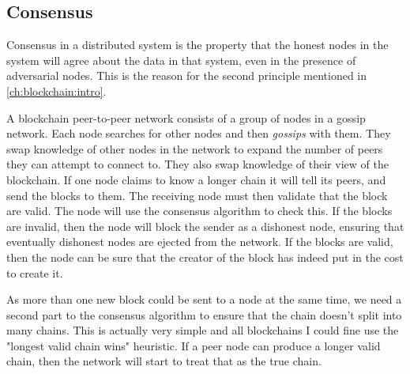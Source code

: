 
\subsection{Consensus}
\label{ch:blockchain:structure:consensus}

Consensus in a distributed system is the property that the honest nodes in the system will agree about the data in that system, even in the presence of adversarial nodes. This is the reason for the second principle mentioned in \autoref{ch:blockchain:intro}.

A blockchain peer-to-peer network consists of a group of nodes in a gossip network. Each node searches for other nodes and then \emph{gossips} with them. They swap knowledge of other nodes in the network to expand the number of peers they can attempt to connect to. They also swap knowledge of their view of the blockchain. If one node claims to know a longer chain it will tell its peers, and send the blocks to them. The receiving node must then validate that the block are valid. The node will use the consensus algorithm to check this. If the blocks are invalid, then the node will block the sender as a dishonest node, ensuring that eventually dishonest nodes are ejected from the network. If the blocks are valid, then the node can be sure that the creator of the block has indeed put in the cost to create it.

As more than one new block could be sent to a node at the same time, we need a second part to the consensus algorithm to ensure that the chain doesn't split into many chains. This is actually very simple and all blockchains I could fine use the "longest valid chain wins" heuristic. If a peer node can produce a longer valid chain, then the network will start to treat that as the true chain.


